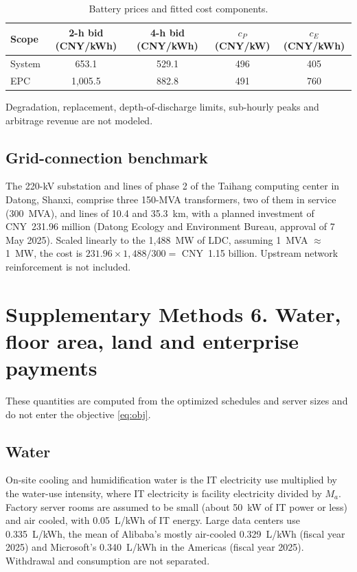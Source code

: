 \documentclass[11pt]{article}
\newcommand{\cny}{CNY~}
\begin{document}
\begin{table}[H]
\centering\small
\caption{Battery prices and fitted cost components.}\label{tab:battery}
\begin{tabular}{@{}lcccc@{}}
\toprule
Scope & 2-h bid (CNY/kWh) & 4-h bid (CNY/kWh) & $c_P$ (CNY/kW) & $c_E$ (CNY/kWh) \\
\midrule
System & 653.1 & 529.1 & 496 & 405 \\
EPC & 1,005.5 & 882.8 & 491 & 760 \\
\bottomrule
\end{tabular}
\end{table}

Degradation, replacement, depth-of-discharge limits, sub-hourly peaks and arbitrage revenue are not modeled.

\subsection*{Grid-connection benchmark}
The 220-kV substation and lines of phase 2 of the Taihang computing center in Datong, Shanxi, comprise three 150-MVA transformers, two of them in service (300~MVA), and lines of 10.4 and 35.3~km, with a planned investment of \cny231.96 million (Datong Ecology and Environment Bureau, approval of 7 May 2025). Scaled linearly to the 1,488~MW of LDC, assuming 1~MVA $\approx$ 1~MW, the cost is $231.96\times1{,}488/300=$ \cny1.15 billion. Upstream network reinforcement is not included.

\clearpage
\section*{Supplementary Methods 6. Water, floor area, land and enterprise payments}

These quantities are computed from the optimized schedules and server sizes and do not enter the objective \eqref{eq:obj}.

\subsection*{Water}
On-site cooling and humidification water is the IT electricity use multiplied by the water-use intensity, where IT electricity is facility electricity divided by $M_a$. Factory server rooms are assumed to be small (about 50~kW of IT power or less) and air cooled, with 0.05~L/kWh of IT energy. Large data centers use 0.335~L/kWh, the mean of Alibaba's mostly air-cooled 0.329~L/kWh (fiscal year 2025) and Microsoft's 0.340~L/kWh in the Americas (fiscal year 2025). Withdrawal and consumption are not separated.
\end{document}
